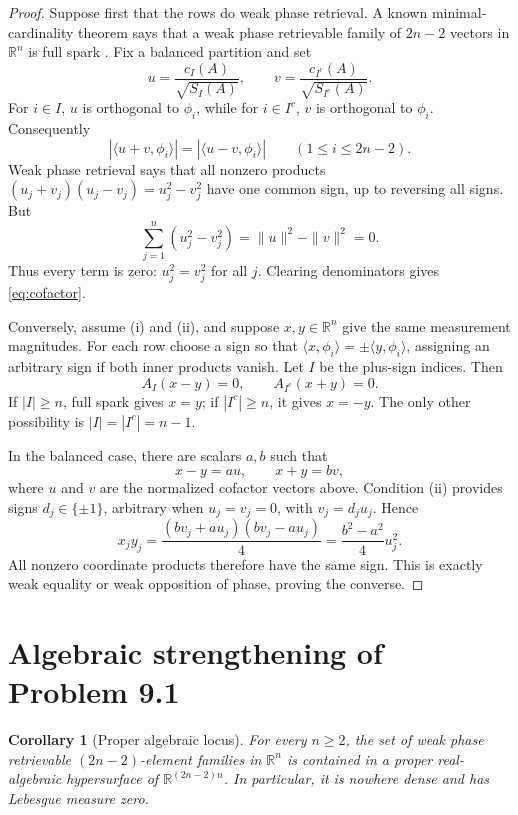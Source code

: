 \documentclass[11pt]{article}
\newtheorem{corollary}{Corollary}
\newcommand{\R}{\mathbb{R}}
\newcommand{\ip}[2]{\langle #1,#2\rangle}
\begin{document}
\begin{proof}
Suppose first that the rows do weak phase retrieval.  A known minimal-cardinality
theorem says that a weak phase retrievable family of $2n-2$ vectors in $\R^n$
is full spark \cite[Theorem 3.7]{BOTELHO2016}.  Fix a balanced partition and set
\[
 u=\frac{c_I(A)}{\sqrt{S_I(A)}},\qquad
 v=\frac{c_{I^c}(A)}{\sqrt{S_{I^c}(A)}}.
\]
For $i\in I$, $u$ is orthogonal to $\phi_i$, while for $i\in I^c$, $v$ is
orthogonal to $\phi_i$.  Consequently
\[
 |\ip{u+v}{\phi_i}|=|\ip{u-v}{\phi_i}|\qquad(1\leq i\leq2n-2).
\]
Weak phase retrieval says that all nonzero products
$(u_j+v_j)(u_j-v_j)=u_j^2-v_j^2$ have one common sign, up to reversing all
signs.  But
\[
 \sum_{j=1}^n(u_j^2-v_j^2)=\|u\|^2-\|v\|^2=0.
\]
Thus every term is zero: $u_j^2=v_j^2$ for all $j$.  Clearing denominators
gives \eqref{eq:cofactor}.

Conversely, assume (i) and (ii), and suppose $x,y\in\R^n$ give the same
measurement magnitudes.  For each row choose a sign so that
$\ip{x}{\phi_i}=\pm\ip{y}{\phi_i}$, assigning an arbitrary sign if both
inner products vanish.  Let $I$ be the plus-sign indices.  Then
\[
 A_I(x-y)=0,\qquad A_{I^c}(x+y)=0.
\]
If $|I|\geq n$, full spark gives $x=y$; if $|I^c|\geq n$, it gives $x=-y$.
The only other possibility is $|I|=|I^c|=n-1$.

In the balanced case, there are scalars $a,b$ such that
\[
 x-y=au,\qquad x+y=bv,
\]
where $u$ and $v$ are the normalized cofactor vectors above.  Condition (ii)
provides signs $d_j\in\{\pm1\}$, arbitrary when $u_j=v_j=0$, with
$v_j=d_ju_j$.  Hence
\[
 x_jy_j=\frac{(bv_j+au_j)(bv_j-au_j)}{4}
        =\frac{b^2-a^2}{4}u_j^2.
\]
All nonzero coordinate products therefore have the same sign.  This is exactly
weak equality or weak opposition of phase, proving the converse.
\end{proof}

\section{Algebraic strengthening of Problem 9.1}

\begin{corollary}[Proper algebraic locus]\label{cor:null}
For every $n\geq2$, the set of weak phase retrievable
$(2n-2)$-element families in $\R^n$ is contained in a proper real-algebraic
hypersurface of $\R^{(2n-2)n}$.  In particular, it is nowhere dense and has
Lebesgue measure zero.
\end{corollary}
\end{document}
